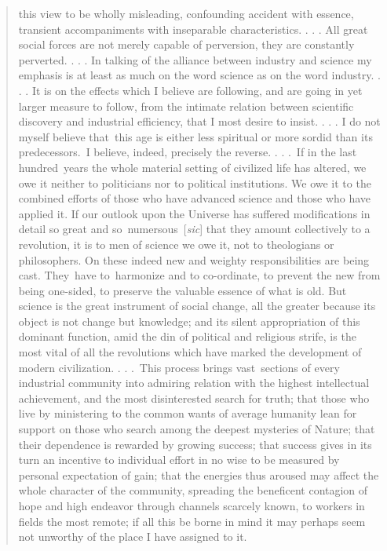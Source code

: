 \documentclass[openany,nobib]{tufte-book}
\begin{document}
\begin{quote}
this view to be wholly misleading, confounding accident with essence,
transient accompaniments with inseparable characteristics. . . . All
great social forces are not merely capable of perversion, they are
constantly perverted. . . . In talking of the alliance between industry
and science my emphasis is at least as much on the word science as on
the word industry. . . . It is on the effects which I believe are
following, and are going in yet larger measure to follow, from the
intimate relation between scientific discovery and industrial
efficiency, that I most desire to insist. . . . I do not myself believe
that~this age is either less spiritual or more sordid than its
predecessors.~I believe, indeed, precisely the reverse. . . .~If in the
last hundred~years the whole material setting of civilized life has
altered, we owe it neither to politicians nor to political institutions.
We owe it to the combined efforts of those who have advanced science and
those who have applied it. If our outlook upon the Universe has suffered
modifications in detail so great and so~numersous~{[}\emph{sic}{]} that
they amount collectively to a revolution, it is to men of science we owe
it, not to theologians or philosophers. On these indeed new and weighty
responsibilities are being cast. They~have to~harmonize and to
co-ordinate, to prevent the new from being one-sided, to preserve the
valuable essence of what is old. But science is the great instrument of
social change, all the greater because its object is not change but
knowledge; and its silent appropriation of this dominant function, amid
the din of political and religious strife, is the most vital of all the
revolutions which have marked the development of modern civilization. .
. .~This process brings vast~sections of every industrial community into
admiring relation with the highest intellectual achievement, and the
most disinterested search for truth; that those who live by ministering
to the common wants of average humanity lean for support on those who
search among the deepest mysteries of Nature; that their dependence is
rewarded by growing success; that success gives in its turn an incentive
to individual effort in no wise to be measured by personal expectation
of gain; that the energies thus aroused may affect the whole character
of the community, spreading the beneficent contagion of hope and high
endeavor through channels scarcely known, to workers in fields the most
remote; if all this be borne in mind it may perhaps seem not unworthy of
the place I have assigned to it.~
\end{quote}
\end{document}
